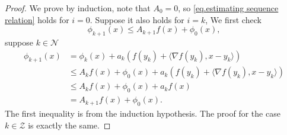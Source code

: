 \documentclass{article}
\begin{document}
\begin{proof}
We prove by induction, note that $A_0 = 0$, so \eqref{eq.estimating sequence relation} holds for $i=0$. Suppose it also holds for $i=k$, 
We first check  
$$\phi_{k+1}(x)\leq A_{k+1} f(x)+\phi_0(x),$$ 
suppose $k\in \mathcal{N}$
\begin{equation*}
    \begin{aligned}
        \phi_{k+1}(x)&=\phi_k(x)+a_k\left (f(y_k)+\langle \nabla f(y_k),x-y_k\rangle \right)\\
        &\leq A_k f(x)+\phi_0(x) +a_k\left (f(y_k)+\langle \nabla f(y_k),x-y_k\rangle \right)\\
        & \leq A_k f(x)+\phi_0(x) +a_k f(x)\\
        &=A_{k+1} f(x)+\phi_0(x).
    \end{aligned}
\end{equation*}
The first inequality is from the induction hypothesis. The proof for the case $k\in \mathcal{Z}$ is exactly the same.


\end{proof}
\end{document}
